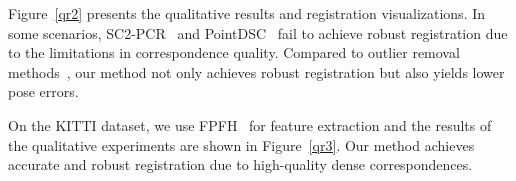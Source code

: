 Figure~\ref{qr2} presents the qualitative results and registration visualizations. In some scenarios, SC2-PCR~\cite{chen2022sc2} and PointDSC~\cite{PointDSC} fail to achieve robust registration due to the limitations in correspondence quality. Compared to outlier removal methods~\cite{fischler1981random,chen2022sc2,PointDSC}, our method not only achieves robust registration but also yields lower pose errors.

\begin{figure*}[ht]
    \caption{
        Qualitative results on KITTI odometry.
       }
    \label{qr3}
\end{figure*}

On the KITTI dataset, we use FPFH~\cite{FPFH} for feature extraction and the results of the qualitative experiments are shown in Figure~\ref{qr3}. Our method achieves accurate and robust registration due to high-quality dense correspondences.

% 
% 
